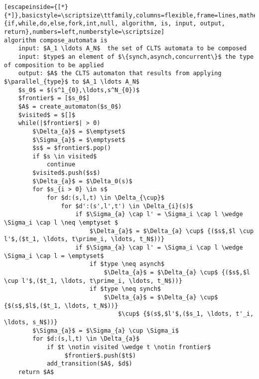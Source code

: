\renewcommand{\ttdefault}{pcr}
\begin{lstlisting}[escapeinside={[*}{*]},basicstyle=\scriptsize\ttfamily,columns=flexible,frame=lines,mathescape=true,xleftmargin=3.0ex,keywordstyle=\textbf,morekeywords={if,while,do,else,fork,int,null, algorithm, is, input, output, return},numbers=left,numberstyle=\scriptsize]
algorithm compose_automata is
	input: $A_1 \ldots A_N$  the set of CLTS automata to be composed
	input: $type$ an element of $\{synch,asynch,concurrent\}$ the type of composition to be applied
	output: $A$ the CLTS automaton that results from applying $\parallel_{type}$ to $A_1 \ldots A_N$
	$s_0$ = $(s^1_{0},\ldots,s^N_{0})$
	$frontier$ = [$s_0$]
	$A$ = create_automaton($s_0$)
	$visited$ = $[]$
	while(|$frontier$| > 0)
		$\Delta_{a}$ = $\emptyset$
		$\Sigma_{a}$ = $\emptyset$		
		$s$ = $frontier$.pop()
		if $s \in visited$
			continue
		$visited$.push($s$)
		$\Delta_{a}$ = $\Delta_0(s)$
		for $s_{i > 0} \in s$ 
			for $d:(s,l,t) \in \Delta_{\cup}$
				for $d':(s',l',t') \in \Delta_{i}(s)$
					if $\Sigma_{a} \cap l' = \Sigma_i \cap l \wedge \Sigma_i \cap l \neq \emptyset $
						$\Delta_{a}$ = $\Delta_{a} \cup$ {($s$,$l \cup l'$,($t_1, \ldots, t\prime_i, \ldots, t_N$))}
					if $\Sigma_{a} \cap l' = \Sigma_i \cap l \wedge \Sigma_i \cap l = \emptyset$
						if $type \neq asynch$
							$\Delta_{a}$ = $\Delta_{a} \cup$ {($s$,$l \cup l'$,($t_1, \ldots, t\prime_i, \ldots, t_N$))}
						if $type \neq synch$							
							$\Delta_{a}$ = $\Delta_{a} \cup$ {$(s$,$l$,($t_1, \ldots, t_N$))} 
								$\cup$ {$(s$,$l'$,($s_1, \ldots, t'_i, \ldots, s_N$))}
		$\Sigma_{a}$ = $\Sigma_{a} \cup \Sigma_i$
		for $d:(s,l,t) \in \Delta_{a}$
			if $t \notin visited \wedge t \notin frontier$ 
				 $frontier$.push($t$)
			add_transition($A$, $d$)			
	return $A$

\end{lstlisting}